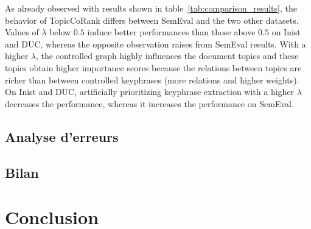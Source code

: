           As already observed with results shown in table~\ref{tab:comparison_results}, the
          behavior of TopicCoRank differs between SemEval and the two other datasets. Values
          of $\lambda$ below $0.5$ induce better performances than those above $0.5$ on Inist and
          DUC, whereas the opposite observation raises from SemEval results. With a higher
          $\lambda$, the controlled graph highly influences the document topics and these topics obtain
          higher importance scores because the relations between topics are richer than
          between controlled keyphrases (more relations and higher weights). On Inist and DUC,
          artificially prioritizing keyphrase extraction with a higher $\lambda$ decreases
          the performance, whereas it increases the performance on SemEval.

    \subsection{Analyse d'erreurs}
    \label{subsec:main-automatic_keyphrase_annotation-supervised_automatic_keyphrase_annotation-error_analysis}

    \subsection{Bilan}
    \label{subsec:main-automatic_keyphrase_annotation-supervised_automatic_keyphrase_annotation-conclusion}


  \section{Conclusion}
  \label{sec:main-automatic_keyphrase_annotation-conclusion}

